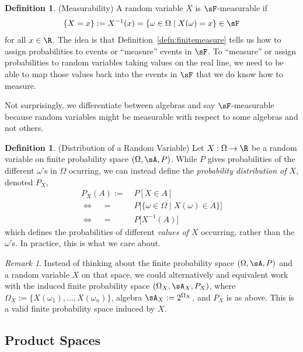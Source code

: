\documentclass[12pt]{article}
\theoremstyle{plain}
\theoremstyle{definition}
\newtheorem{defn}[thm]{Definition}
\theoremstyle{remark}
\newtheorem*{rmk}{Remark}
\newcommand{\ra}{\rightarrow}
\begin{document}
\begin{defn}{(Measurability)}
A random variable $X$ is $\sF$-measurable if
\begin{align*}
  \{X=x\} :=
  X^{-1}(x) =
  \{\omega\in\Omega \; | \; X(\omega)=x\}
  \in \sF
\end{align*}
for all $x\in\R$. The idea is that Definition~\ref{defn:finitemeasure}
tells us how to assign probabilities to events or ``measure'' events in
$\sF$. To ``measure'' or assign probabilities to random variables
taking values on the real line, we need to be able to map those values
back into the events in $\sF$ that we do know how to measure.

Not surprisingly, we differentiate between algebras and say
$\sF$-measurable because random variables might be measurable with
respect to some algebras and not others.
\end{defn}

\begin{defn}(Distribution of a Random Variable)
Let $X:\Omega\ra\R$ be a random variable on finite probability space
$(\Omega,\sA,P)$. While $P$ gives probabilities of the different
$\omega$'s in $\Omega$ ocurring, we can instead define
the \emph{probability distribution of $X$}, denoted $P_X$,
\begin{align*}
  P_X(A) :=&\; P[X \in A] \\
  \iff \quad
  =&\; P\big[
    \{\omega \in \Omega\;|\; X(\omega) \in A\}
  \big] \\
  \iff \quad
  =&\; P\big[ X^{-1}(A) \big]
\end{align*}
which defines the probabilities of different \emph{values of $X$}
occurring, rather than the $\omega$'s. In practice, this is what we care
about.
\end{defn}

\begin{rmk}
Instead of thinking about the finite probability space
$(\Omega,\sA,P)$ and a random variable $X$ on that space, we could
alternatively and equivalent work with the induced finite probability
space $(\Omega_X,\sA_X,P_X)$, where
$\Omega_X:=\{X(\omega_1),\ldots,X(\omega_n)\}$, algebra
$\sA_X:=2^{\Omega_X}$, and $P_X$ is as above. This is a valid finite
probability space induced by $X$.
\end{rmk}

\clearpage
\subsection{Product Spaces}
\end{document}
